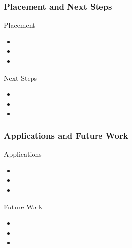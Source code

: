 \begin{frame}
  \frametitle{Placement and Next Steps}
  \begin{block}{Placement}
    \begin{itemize}
      \item 
      \item 
      \item 
    \end{itemize}
  \end{block}
  \begin{block}{Next Steps}
    \begin{itemize}
      \item 
      \item
      \item
    \end{itemize}
  \end{block}
\end{frame}

\begin{frame}
  \frametitle{Applications and Future Work}
  \begin{block}{Applications}
    \begin{itemize}
      \item 
      \item 
      \item 
    \end{itemize}
  \end{block}
  \begin{block}{Future Work}
    \begin{itemize}
      \item 
      \item
      \item
    \end{itemize}
  \end{block}
\end{frame}
